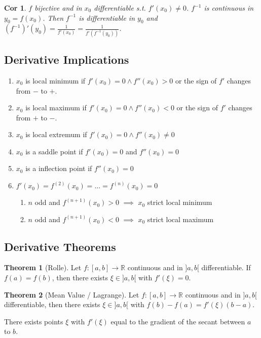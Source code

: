 \documentclass[a4paper, 10pt]{article}
\newtheorem*{corollary}{Cor}
\theoremstyle{definition}
\theoremstyle{ex}
\theoremstyle{named}
\newtheorem*{ntheorem_wrapper}{Theorem}
\newenvironment{ntheorem}%
    {\begin{mdframed}[style=important]\begin{ntheorem_wrapper}}%
    {\end{ntheorem_wrapper}\end{mdframed}}
\newcommand{\R}{\mathbb{R}}
\begin{document}
\begin{corollary}
    $f$ bijective and in $x_0$ differentiable s.t. $f'(x_0) \neq 0$. $f^{-1}$ is continuous in $y_0 = f(x_0)$. Then $f^{-1}$ is differentiable in $y_0$ and $(f^{-1})'(y_0) = \frac{1}{f'(x_0)} = \frac{1}{f'(f^{-1}(y_0))}$. 
\end{corollary}

\subsection{Derivative Implications}
\begin{enumerate}
    \item $x_0$ is local minimum if $f'(x_0) = 0 \land f''(x_0) > 0$ or the sign of $f'$ changes from $-$ to $+$.
    \item $x_0$ is local maximum if $f'(x_0) = 0 \land f''(x_0) < 0$ or the sign of $f'$ changes from $+$ to $-$.
    \item $x_0$ is local extremum if $f'(x_0) = 0 \land f''(x_0) \neq 0$
    \item $x_0$ is a saddle point if $f'(x_0) = 0$ and $f''(x_0) = 0$
    \item $x_0$ is a inflection point if $f''(x_0) = 0$
    \item $f'(x_0) = f^{(2)}(x_0) = \ldots = f^{(n)}(x_0) = 0$
    \begin{enumerate}
        \item $n$ odd and $f^{(n+1)}(x_0) > 0$ $\implies$ $x_0$ strict local minimum
        \item $n$ odd and $f^{(n+1)}(x_0) < 0$ $\implies$ $x_0$ strict local maximum
    \end{enumerate}
\end{enumerate}

\subsection{Derivative Theorems}
\begin{ntheorem}[Rolle]
    Let $f: [a, b] \to \R$ continuous and in $]a, b[$ differentiable. If $f(a) = f(b)$, then there exists $\xi \in ]a, b[$ with $f'(\xi) = 0$.
\end{ntheorem}

\begin{ntheorem}[Mean Value / Lagrange]
    Let $f: [a, b] \to \R$ continuous and in $]a, b[$ differentiable, then there exists $\xi \in ]a, b[$ with $f(b) - f(a) = f'(\xi)(b-a)$.

    There exists points $\xi$ with $f'(\xi)$ equal to the gradient of the secant between $a$ to $b$.
\end{ntheorem}
\end{document}
